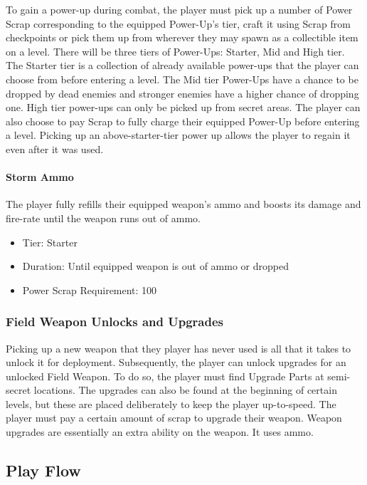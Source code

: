 \documentclass[12pt]{article}
\begin{document}
To gain a power-up during combat, the player must pick up a number of Power Scrap corresponding to the equipped Power-Up's tier, craft it using Scrap from checkpoints or pick them up from wherever they may spawn as a collectible item on a level. There will be three tiers of Power-Ups: Starter, Mid and High tier. The Starter tier is a collection of already available power-ups that the player can choose from before entering a level. The Mid tier Power-Ups have a chance to be dropped by dead enemies and stronger enemies have a higher chance of dropping one. High tier power-ups can only be picked up from secret areas. The player can also choose to pay Scrap to fully charge their equipped Power-Up before entering a level. Picking up an above-starter-tier power up allows the player to regain it even after it was used. 

\paragraph{Storm Ammo}

The player fully refills their equipped weapon's ammo and boosts its damage and fire-rate until the weapon runs out of ammo.

\begin{itemize}
	\item Tier: Starter
	\item Duration: Until equipped weapon is out of ammo or dropped 
	\item Power Scrap Requirement: 100
\end{itemize}

\subsubsection{Field Weapon Unlocks and Upgrades}

Picking up a new weapon that they player has never used is all that it takes to unlock it for deployment. Subsequently, the player can unlock upgrades for an unlocked Field Weapon. To do so, the player must find Upgrade Parts at semi-secret locations. The upgrades can also be found at the beginning of certain levels, but these are placed deliberately to keep the player up-to-speed. The player must pay a certain amount of scrap to upgrade their weapon. Weapon upgrades are essentially an extra ability on the weapon. It uses ammo.

\subsection{Play Flow}
\end{document}
